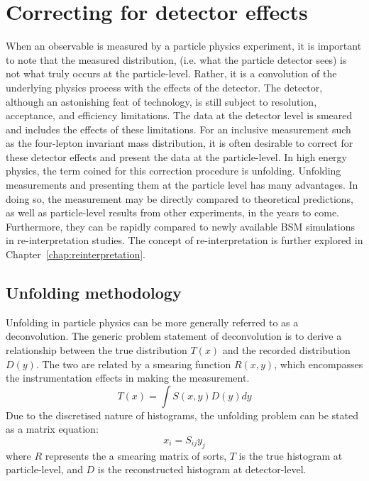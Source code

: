 \section{Correcting for detector effects}
\label{sec:unfolding}

When an observable is measured by a particle physics experiment, it is important to note that the measured distribution, (i.e. what the particle detector sees) is not what truly occurs at the particle-level. Rather, it is a convolution of the underlying physics process with the effects of the detector. The \ATLAS detector, although an astonishing feat of technology, is still subject to resolution, acceptance, and efficiency limitations. The data at the detector level is smeared and includes the effects of these limitations. For an inclusive measurement such as the four-lepton invariant mass distribution, it is often desirable to correct for these detector effects and present the data at the particle-level. In high energy physics, the term coined for this correction procedure is unfolding. Unfolding measurements and presenting them at the particle level has many advantages. In doing so, the measurement may be directly compared to theoretical predictions, as well as particle-level results from other experiments, in the years to come. Furthermore, they can be rapidly compared to newly available BSM simulations in re-interpretation studies. The concept of re-interpretation is further explored in Chapter~\ref{chap:reinterpretation}. 

\subsection{Unfolding methodology}
\label{subsec:unfmethod}

Unfolding in particle physics can be more generally referred to as a deconvolution. The generic problem statement of deconvolution is to derive a relationship between the true distribution $T(x)$ and the recorded distribution $D(y)$. The two are related by a smearing function $R(x,y)$, which encompasses the instrumentation effects in making the measurement. 
\begin{equation} \label{eq:unfintegral}
    T(x)=\int S(x,y)D(y)dy
\end{equation}
Due to the discretised nature of histograms, the unfolding problem can be stated as a matrix equation:
\begin{equation} \label{eq:unfmatrix}
    x_i=S_{ij}y_j
\end{equation}
where $R$ represents the a smearing matrix of sorts, $T$ is the true histogram at particle-level, and $D$ is the reconstructed histogram at detector-level. 


